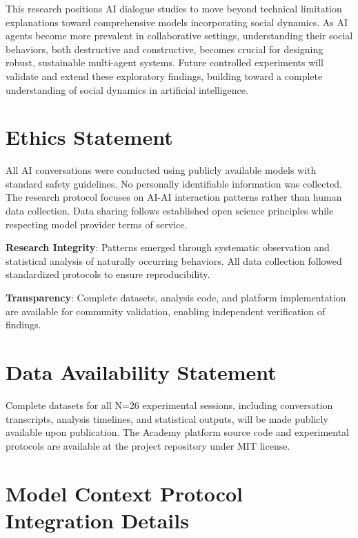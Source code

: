 \documentclass[11pt,letterpaper]{article}
\newcommand{\theacademy}{The Academy}
\newcommand{\exponedataTotalSessionsRaw}{26}
\newcommand{\exponedataTotalSessions}{N=\exponedataTotalSessionsRaw}
\begin{document}
This research positions AI dialogue studies to move beyond technical limitation explanations toward comprehensive models incorporating social dynamics. As AI agents become more prevalent in collaborative settings, understanding their social behaviors, both destructive and constructive, becomes crucial for designing robust, sustainable multi-agent systems. Future controlled experiments will validate and extend these exploratory findings, building toward a complete understanding of social dynamics in artificial intelligence.

\section{Ethics Statement}

All AI conversations were conducted using publicly available models with standard safety guidelines. No personally identifiable information was collected. The research protocol focuses on AI-AI interaction patterns rather than human data collection. Data sharing follows established open science principles while respecting model provider terms of service.

\textbf{Research Integrity}: Patterns emerged through systematic observation and statistical analysis of naturally occurring behaviors. All data collection followed standardized protocols to ensure reproducibility.

\textbf{Transparency}: Complete datasets, analysis code, and platform implementation are available for community validation, enabling independent verification of findings.

\section*{Data Availability Statement}

Complete datasets for all \exponedataTotalSessions{} experimental sessions, including conversation transcripts, analysis timelines, and statistical outputs, will be made publicly available upon publication. \theacademy{} platform source code and experimental protocols are available at the project repository under MIT license.




\appendix

\section{Model Context Protocol Integration Details}
\label{app:mcp}
\end{document}
